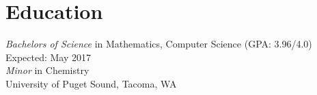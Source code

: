 \section{Education}
{\sl Bachelors of Science} in Mathematics, Computer Science (GPA: 3.96/4.0) \hfill Expected: May 2017\\
{\sl Minor} in Chemistry\\
University of Puget Sound, Tacoma, WA
  \vspace{-3.5mm}
